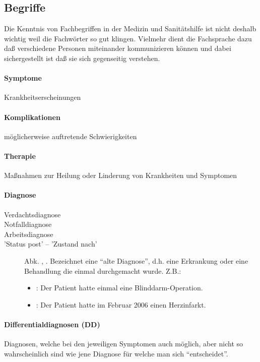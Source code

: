 \subsection{Begriffe}

Die Kenntnis von Fachbegriffen in der Medizin und
Sanitätshilfe ist nicht deshalb wichtig weil die Fachwörter
so gut klingen. Vielmehr dient die Fachsprache dazu daß
verschiedene Personen miteinander kommunizieren können und
dabei sichergestellt ist daß sie sich gegenseitig verstehen.

\paragraph{Symptome} Krankheitserscheinungen
\paragraph{Komplikationen} möglicherweise auftretende
Schwierigkeiten
\paragraph{Therapie} Ma{\ss}nahmen zur Heilung oder
Linderung von Krankheiten und Symptomen
\paragraph{Diagnose}
\begin{description}
    \item[Verdachtsdiagnose]
    \item[Notfalldiagnose]
    \item[Arbeitsdiagnose]
    \item['Status post' -- 'Zustand nach'] Abk. ,
    . Bezeichnet eine ``alte Diagnose'', d.h. eine
    Erkrankung oder eine Behandlung die einmal durchgemacht
    wurde. Z.B.:
    \begin{itemize}
        \item {}: Der Patient
        hatte einmal eine Blinddarm-Operation.
        \item {}: Der Patient
        hatte im Februar 2006 einen Herzinfarkt.
    \end{itemize}
\end{description}
\paragraph{Differentialdiagnosen (DD)} Diagnosen,
welche bei den jeweiligen Symptomen auch
möglich, aber nicht so wahrscheinlich sind wie jene
Diagnose für welche man sich ``entscheidet''.

